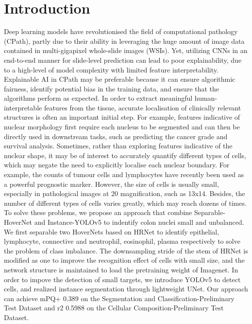 \documentclass[conference]{IEEEtran}
\begin{document}
\section{Introduction}
Deep learning models have revolutionised the field of computational pathology (CPath), partly due to their ability in leveraging the huge amount of image data contained in multi-gigapixel whole-slide images (WSIs). Yet, utilizing CNNs in an end-to-end manner for slide-level prediction can lead to poor explainability, due to a high-level of model complexity with limited feature interpretability. Explainable AI in CPath may be preferable because it can ensure algorithmic fairness, identify potential bias in the training data, and ensure that the algorithms perform as expected. In order to extract meaningful human-interpretable features from the tissue, accurate localisation of clinically relevant structures is often an important initial step. For example, features indicative of nuclear morphology first require each nucleus to be segmented and can then be directly used in downstream tasks, such as predicting the cancer grade and survival analysis. Sometimes, rather than exploring features indicative of the nuclear shape, it may be of interest to accurately quantify different types of cells, which may negate the need to explicitly localise each nuclear boundary. For example, the counts of tumour cells and lymphocytes have recently been used as a powerful prognostic marker.
However, the size of cells is usually small, especially in pathological images at 20 magnification, such as 13x14. Besides, the number of different types of cells varies greatly, which may reach dozens of times. To solve these problems, we propose an approach that combine Separable-HoverNet\cite{b2} and Instance-YOLOv5 to indentify colon nuclei small and unbalanced. We first separable two HoverNets based on HRNet to identify epithelial, lymphocyte, connective and neutrophil, eosinophil, plasma respectively to solve the problem of class imbalance. The downsampling stride of the stem of HRNet\cite{b3} is modified as one to improve the recognition effect of cells with small size, and the network structure is maintained to load the pretraining weight of Imagenet. In order to impove the detection of small targets, we introduce YOLOv5 to detect cells, and realized instance segmentation through lightweight UNet\cite{b4}. Our approach can achieve mPQ+ 0.389 on the Segmentation and Classification-Preliminary Test Dataset and r2 0.5988 on the Cellular Composition-Preliminary Test Dataset.
\end{document}

